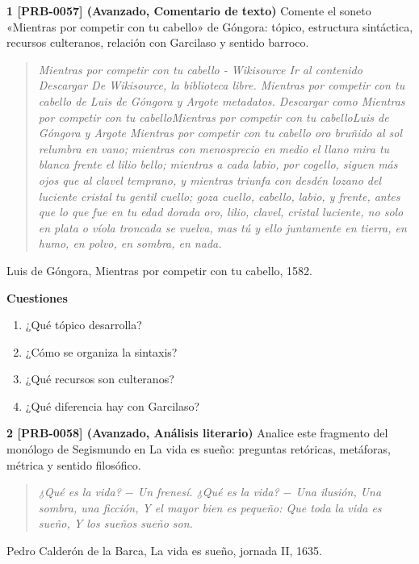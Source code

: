 \documentclass{book}
\begin{document}
\begin{tcolorbox}[title={Ejercicios}, studiumworked, breakable]

\noindent\textbf{1 [PRB-0057] (Avanzado, Comentario de texto)}
Comente el soneto «Mientras por competir con tu cabello» de Góngora: tópico, estructura sintáctica, recursos culteranos, relación con Garcilaso y sentido barroco.


\begin{quote}
\itshape Mientras por competir con tu cabello - Wikisource Ir al contenido Descargar De Wikisource, la biblioteca libre. Mientras por competir con tu cabello de Luis de Góngora y Argote metadatos. Descargar como Mientras por competir con tu cabelloMientras por competir con tu cabelloLuis de Góngora y Argote Mientras por competir con tu cabello oro bruñido al sol relumbra en vano; mientras con menosprecio en medio el llano mira tu blanca frente el lilio bello; mientras a cada labio, por cogello, siguen más ojos que al clavel temprano, y mientras triunfa con desdén lozano del luciente cristal tu gentil cuello; goza cuello, cabello, labio, y frente, antes que lo que fue en tu edad dorada oro, lilio, clavel, cristal luciente, no solo en plata o víola troncada se vuelva, mas tú y ello juntamente en tierra, en humo, en polvo, en sombra, en nada.
\end{quote}
{\noindent\footnotesize Luis de Góngora, Mientras por competir con tu cabello, 1582.\par}

\noindent\textbf{Cuestiones}
\begin{enumerate}
\item ¿Qué tópico desarrolla?
\item ¿Cómo se organiza la sintaxis?
\item ¿Qué recursos son culteranos?
\item ¿Qué diferencia hay con Garcilaso?
\end{enumerate}

\noindent\textbf{2 [PRB-0058] (Avanzado, Análisis literario)}
Analice este fragmento del monólogo de Segismundo en La vida es sueño: preguntas retóricas, metáforas, métrica y sentido filosófico.


\begin{quote}
\itshape ¿Qué es la vida? \(-\) Un frenesí. ¿Qué es la vida? \(-\) Una ilusión, Una sombra, una ficción, Y el mayor bien es pequeño: Que toda la vida es sueño, Y los sueños sueño son.
\end{quote}
{\noindent\footnotesize Pedro Calderón de la Barca, La vida es sueño, jornada II, 1635.\par}


\end{tcolorbox}
\end{document}

